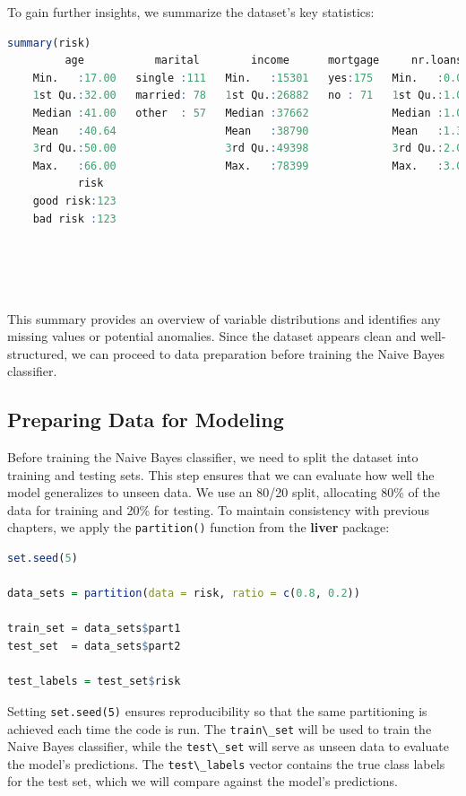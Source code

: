 \documentclass[
]{book}
\newcommand{\passthrough}[1]{#1}
\theoremstyle{definition}
\theoremstyle{definition}
\theoremstyle{definition}
\theoremstyle{definition}
\theoremstyle{remark}
\begin{document}
To gain further insights, we summarize the dataset's key statistics:

\begin{lstlisting}[language=R]
summary(risk)
         age           marital        income      mortgage     nr.loans    
    Min.   :17.00   single :111   Min.   :15301   yes:175   Min.   :0.000  
    1st Qu.:32.00   married: 78   1st Qu.:26882   no : 71   1st Qu.:1.000  
    Median :41.00   other  : 57   Median :37662             Median :1.000  
    Mean   :40.64                 Mean   :38790             Mean   :1.309  
    3rd Qu.:50.00                 3rd Qu.:49398             3rd Qu.:2.000  
    Max.   :66.00                 Max.   :78399             Max.   :3.000  
           risk    
    good risk:123  
    bad risk :123  
                   
                   
                   
   
\end{lstlisting}

This summary provides an overview of variable distributions and identifies any missing values or potential anomalies. Since the dataset appears clean and well-structured, we can proceed to data preparation before training the Naive Bayes classifier.

\subsection*{Preparing Data for Modeling}\label{preparing-data-for-modeling-1}

Before training the Naive Bayes classifier, we need to split the dataset into training and testing sets. This step ensures that we can evaluate how well the model generalizes to unseen data. We use an 80/20 split, allocating 80\% of the data for training and 20\% for testing. To maintain consistency with previous chapters, we apply the \passthrough{\lstinline!partition()!} function from the \textbf{liver} package:

\begin{lstlisting}[language=R]
set.seed(5)

data_sets = partition(data = risk, ratio = c(0.8, 0.2))

train_set = data_sets$part1
test_set  = data_sets$part2

test_labels = test_set$risk
\end{lstlisting}

Setting \passthrough{\lstinline!set.seed(5)!} ensures reproducibility so that the same partitioning is achieved each time the code is run. The \passthrough{\lstinline!train\_set!} will be used to train the Naive Bayes classifier, while the \passthrough{\lstinline!test\_set!} will serve as unseen data to evaluate the model's predictions. The \passthrough{\lstinline!test\_labels!} vector contains the true class labels for the test set, which we will compare against the model's predictions.
\end{document}
